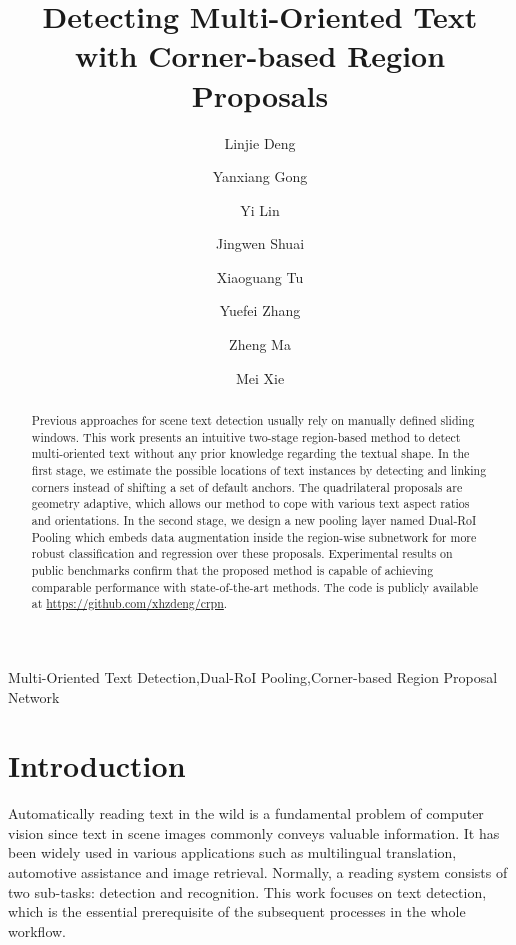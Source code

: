 \documentclass[3p, times]{elsarticle}
\begin{document}
\begin{frontmatter}

\title{Detecting Multi-Oriented Text with Corner-based Region Proposals}

\author[a]{Linjie Deng}
\author[a]{Yanxiang Gong}
\author[b]{Yi Lin}
\author[a]{Jingwen Shuai}
\author[a]{Xiaoguang Tu}
\author[c]{Yuefei Zhang}
\author[a]{Zheng Ma}
\author[a]{Mei Xie}

\address[a]{School of Information and Communication Engineering, UESTC, Chengdu, China}
\address[b]{National Key Laboratory of Fundamental Science on Synthetic Vision, Sichuan University, Chengdu, China}
\address[c]{Chongqing Institute of Public Security Science and Technology, Chongqing, China}


\begin{abstract}
Previous approaches for scene text detection usually rely on manually defined sliding windows. This work presents an intuitive two-stage region-based method to detect multi-oriented text without any prior knowledge regarding the textual shape. In the first stage, we estimate the possible locations of text instances by detecting and linking corners instead of shifting a set of default anchors. The quadrilateral proposals are geometry adaptive, which allows our method to cope with various text aspect ratios and orientations. In the second stage, we design a new pooling layer named Dual-RoI Pooling which embeds data augmentation inside the region-wise subnetwork for more robust classification and regression over these proposals. Experimental results on public benchmarks confirm that the proposed method is capable of achieving comparable performance with state-of-the-art methods. The code is publicly available at \url{https://github.com/xhzdeng/crpn}.

\end{abstract}

\begin{keyword}
Multi-Oriented Text Detection\sep Dual-RoI Pooling\sep Corner-based Region Proposal Network
\end{keyword}

\end{frontmatter}







\section{Introduction}
Automatically reading text in the wild is a fundamental problem of computer vision since text in scene images commonly conveys valuable information. It has been widely used in various applications such as multilingual translation, automotive assistance and image retrieval. Normally, a reading system consists of two sub-tasks: detection and recognition. This work focuses on text detection, which is the essential prerequisite of the subsequent processes in the whole workflow.
\end{document}
